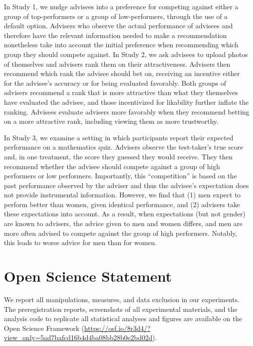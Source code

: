 \documentclass[
  man,
  floatsintext,
  longtable,
  nolmodern,
  notxfonts,
  notimes,
  colorlinks=true,linkcolor=blue,citecolor=blue,urlcolor=blue]{apa7}
\begin{document}
In Study 1, we nudge advisees into a preference for competing against
either a group of top-performers or a group of low-performers, through
the use of a default option. Advisers who observe the actual performance
of advisees and therefore have the relevant information needed to make a
recommendation nonetheless take into account the initial preference when
recommending which group they should compete against. In Study 2, we ask
advisees to upload photos of themselves and advisers rank them on their
attractiveness. Advisers then recommend which rank the advisee should
bet on, receiving an incentive either for the advisee's accuracy or for
being evaluated favorably. Both groups of advisers recommend a rank that
is more attractive than what they themselves have evaluated the advisee,
and those incentivized for likability further inflate the ranking.
Advisees evaluate advisers more favorably when they recommend betting on
a more attractive rank, including viewing them as more trustworthy.

In Study 3, we examine a setting in which participants report their
expected performance on a mathematics quiz. Advisers observe the
test-taker's true score and, in one treatment, the score they guessed
they would receive. They then recommend whether the advisee should
compete against a group of high performers or low performers.
Importantly, this ``competition'' is based on the past performance
observed by the adviser and thus the advisee's expectation does not
provide instrumental information. However, we find that (1) men expect
to perform better than women, given identical performance, and (2)
advisers take these expectations into account. As a result, when
expectations (but not gender) are known to advisers, the advice given to
men and women differs, and men are more often advised to compete against
the group of high performers. Notably, this leads to worse advice for
men than for women.

\section{Open Science Statement}\label{open-science-statement}

We report all manipulations, measures, and data exclusion in our
experiments. The preregistration reports, screenshots of all
experimental materials, and the analysis code to replicate all
statistical analyses and figures are available on the Open Science
Framework
(\url{https://osf.io/8r3d4/?view_only=5ad7bafcd16b4d4ba08bb28b0e2bd02d}).
\end{document}
